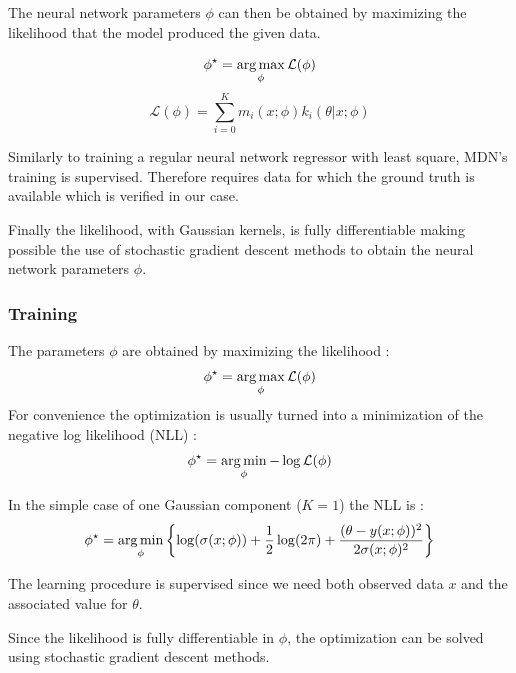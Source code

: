 The neural network parameters $\phi$ can then be obtained by maximizing the likelihood that the model produced the given data.

\begin{equation}
    \phi^\star = \operatorname*{arg\,max}_\phi \mathcal L (\phi)
\end{equation}
\begin{equation}
    \mathcal L (\phi) = \sum_{i=0}^K m_i(x ; \phi) k_i(\theta | x ; \phi)
\end{equation}

Similarly to training a regular neural network regressor with least square, MDN's training is supervised.
Therefore requires data for which the ground truth is available which is verified in our case.

Finally the likelihood, with Gaussian kernels, is fully differentiable making possible the use of stochastic gradient descent methods to obtain the neural network parameters $\phi$.

\subsubsection{Training}


The parameters $\phi$ are obtained by maximizing the likelihood :
\begin{equation}
    \phi^\star = \operatorname*{arg\,max}_\phi \mathcal L (\phi)
\end{equation}
For convenience the optimization is usually turned into a minimization of the negative log likelihood (NLL) :
\begin{equation}
    \phi^\star = \operatorname*{arg\,min}_\phi - \log \mathcal L (\phi)
\end{equation}

In the simple case of one Gaussian component ($K=1$) the NLL is :
\begin{equation}
    \phi^\star = \operatorname*{arg\,min}_\phi \left\{ \log(\sigma(x;\phi)) + \frac{1}{2}\log(2\pi) + \frac{(\theta - y(x;\phi))^2}{2\sigma(x;\phi)^2} \right\}
\end{equation}

The learning procedure is supervised since we need both observed data $x$ and the associated value for  $\theta$.

Since the likelihood is fully differentiable in $\phi$, the optimization can be solved using stochastic gradient descent methods.

